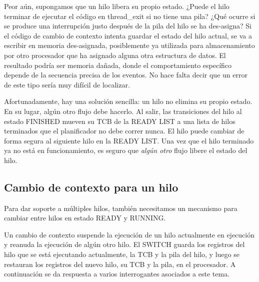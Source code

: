 \documentclass[10pt]{book}
\begin{document}
Peor aún, supongamos que un hilo libera su propio estado. ¿Puede el hilo terminar de ejecutar el código en {\mf thread\_exit} si no tiene una pila? ¿Qué ocurre si se produce una interrupción justo después de la pila del hilo se ha des-asigna? Si el código de cambio de contexto intenta guardar el estado del hilo actual, se va a escribir en memoria des-asignada, posiblemente ya utilizada para almacenamiento por otro procesador que ha asignado alguna otra estructura de datos. El resultado podría ser memoria dañada, donde el comportamiento específico depende de la secuencia precisa de los eventos. No hace falta decir que un error de este tipo sería muy difícil de localizar.

Afortunadamente, hay una solución sencilla: un hilo no elimina su propio estado. En su lugar, algún otro flujo debe hacerlo. Al salir, las transiciones del hilo al estado FINISHED mueven su TCB de la READY LIST a una lista de hilos terminados que el planificador no debe correr nunca. El hilo puede cambiar de forma segura al siguiente hilo en la READY LIST. Una vez que el hilo terminado ya no está en funcionamiento, es seguro que \textit{algún otro} flujo libere el estado del hilo.

\subsection{Cambio de contexto para un hilo}
Para dar soporte a múltiples hilos, también necesitamos un mecanismo para cambiar entre hilos en estado READY y RUNNING.

Un cambio de contexto suspende la ejecución de un hilo actualmente en ejecución y reanuda la ejecución de algún otro hilo. El SWITCH guarda los registros del hilo que se está ejecutando actualmente, la TCB y la pila del hilo, y luego se restauran los registros del nuevo hilo, su TCB y la pila, en el procesador. A continuación se da respuesta a varios interrogantes asociados a este tema.
\end{document}
